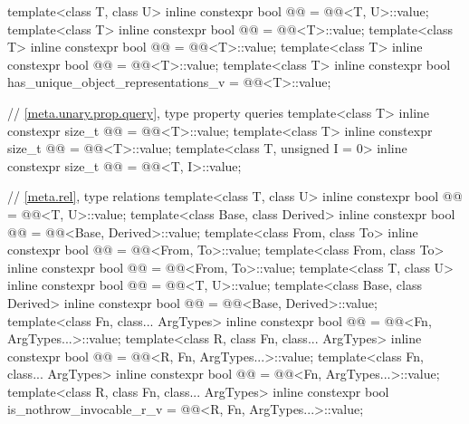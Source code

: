 \begin{codeblock}
{  template<class T, class U>
    inline constexpr bool @@ = @@<T, U>::value;
  template<class T>
    inline constexpr bool @@ = @@<T>::value;
  template<class T>
    inline constexpr bool @@ = @@<T>::value;
  template<class T>
    inline constexpr bool @@ = @@<T>::value;
  template<class T>
    inline constexpr bool has_unique_object_representations_v
      = @@<T>::value;

  // \ref{meta.unary.prop.query}, type property queries
  template<class T>
    inline constexpr size_t @@ = @@<T>::value;
  template<class T>
    inline constexpr size_t @@ = @@<T>::value;
  template<class T, unsigned I = 0>
    inline constexpr size_t @@ = @@<T, I>::value;

  // \ref{meta.rel}, type relations
  template<class T, class U>
    inline constexpr bool @@ = @@<T, U>::value;
  template<class Base, class Derived>
    inline constexpr bool @@ = @@<Base, Derived>::value;
  template<class From, class To>
    inline constexpr bool @@ = @@<From, To>::value;
  template<class From, class To>
    inline constexpr bool @@ = @@<From, To>::value;
  template<class T, class U>
    inline constexpr bool @@ = @@<T, U>::value;
  template<class Base, class Derived>
    inline constexpr bool @@
      = @@<Base, Derived>::value;
  template<class Fn, class... ArgTypes>
    inline constexpr bool @@ = @@<Fn, ArgTypes...>::value;
  template<class R, class Fn, class... ArgTypes>
    inline constexpr bool @@ = @@<R, Fn, ArgTypes...>::value;
  template<class Fn, class... ArgTypes>
    inline constexpr bool @@ = @@<Fn, ArgTypes...>::value;
  template<class R, class Fn, class... ArgTypes>
    inline constexpr bool is_nothrow_invocable_r_v
      = @@<R, Fn, ArgTypes...>::value;

}
\end{codeblock}
